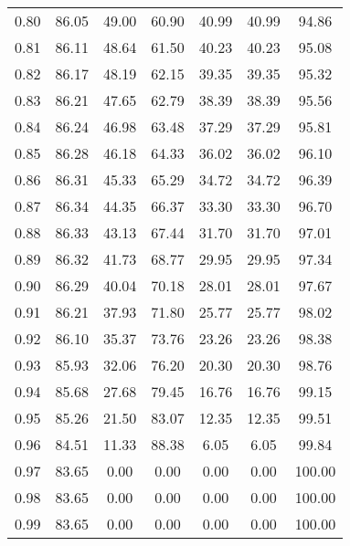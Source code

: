 \begin{tabular}{|c|c|c|c|c|c|c|}
      0.80 &     86.05 &     49.00 &      60.90 &   40.99 &      40.99 &         94.86 \\
      0.81 &     86.11 &     48.64 &      61.50 &   40.23 &      40.23 &         95.08 \\
      0.82 &     86.17 &     48.19 &      62.15 &   39.35 &      39.35 &         95.32 \\
      0.83 &     86.21 &     47.65 &      62.79 &   38.39 &      38.39 &         95.56 \\
      0.84 &     86.24 &     46.98 &      63.48 &   37.29 &      37.29 &         95.81 \\
      0.85 &     86.28 &     46.18 &      64.33 &   36.02 &      36.02 &         96.10 \\
      0.86 &     86.31 &     45.33 &      65.29 &   34.72 &      34.72 &         96.39 \\
      0.87 &     86.34 &     44.35 &      66.37 &   33.30 &      33.30 &         96.70 \\
      0.88 &     86.33 &     43.13 &      67.44 &   31.70 &      31.70 &         97.01 \\
      0.89 &     86.32 &     41.73 &      68.77 &   29.95 &      29.95 &         97.34 \\
      0.90 &     86.29 &     40.04 &      70.18 &   28.01 &      28.01 &         97.67 \\
      0.91 &     86.21 &     37.93 &      71.80 &   25.77 &      25.77 &         98.02 \\
      0.92 &     86.10 &     35.37 &      73.76 &   23.26 &      23.26 &         98.38 \\
      0.93 &     85.93 &     32.06 &      76.20 &   20.30 &      20.30 &         98.76 \\
      0.94 &     85.68 &     27.68 &      79.45 &   16.76 &      16.76 &         99.15 \\
      0.95 &     85.26 &     21.50 &      83.07 &   12.35 &      12.35 &         99.51 \\
      0.96 &     84.51 &     11.33 &      88.38 &    6.05 &       6.05 &         99.84 \\
      0.97 &     83.65 &      0.00 &       0.00 &    0.00 &       0.00 &        100.00 \\
      0.98 &     83.65 &      0.00 &       0.00 &    0.00 &       0.00 &        100.00 \\
      0.99 &     83.65 &      0.00 &       0.00 &    0.00 &       0.00 &        100.00 \\
\bottomrule
\end{tabular}
